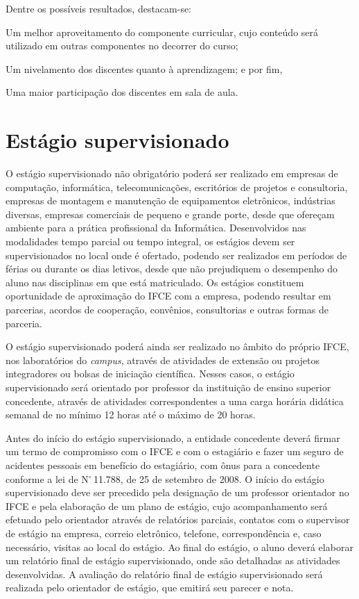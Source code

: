 \documentclass[
	12pt,				%
	openright,			%
	twoside,			%
	a4paper,			%
	chapter=TITLE,		%
	english,			%
	french,				%
	spanish,			%
	brazil,				%
	]{abntex2}
\begin{document}
Dentre os possíveis resultados, destacam-se: 
\begin{alineas}
\item Um melhor aproveitamento do componente curricular, cujo conteúdo será utilizado em outras componentes no decorrer do curso;
\item Um nivelamento dos discentes quanto à aprendizagem; e por fim,
\item Uma maior participação dos discentes em sala de aula.
\end{alineas}



\chapter{Estágio supervisionado}

O estágio supervisionado não obrigatório poderá ser realizado em empresas de computação, informática, telecomunicações, escritórios de projetos e consultoria, empresas de montagem e manutenção de equipamentos eletrônicos, indústrias diversas, empresas comerciais de pequeno e grande porte, desde que ofereçam ambiente para a prática profissional da Informática.  Desenvolvidos nas modalidades tempo parcial ou tempo integral, os estágios devem ser supervisionados no local onde é ofertado, podendo ser realizados em períodos de férias ou durante os dias letivos, desde que não prejudiquem o desempenho do aluno nas disciplinas em que está matriculado.
Os estágios constituem oportunidade de aproximação do IFCE com a empresa, podendo resultar em parcerias, acordos de cooperação, convênios, consultorias e outras formas de parceria.


O estágio supervisionado poderá ainda ser realizado no âmbito do próprio IFCE, nos laboratórios do \textit{campus}, através de atividades de extensão ou projetos integradores ou bolsas de iniciação científica. Nesses casos, o estágio supervisionado será orientado por professor da instituição de ensino superior concedente, através de atividades correspondentes a uma carga horária didática semanal de no mínimo 12 horas até o máximo de 20 horas.

Antes do início do estágio supervisionado, a entidade concedente deverá firmar um termo de compromisso com o IFCE e com o estagiário e fazer um seguro de acidentes pessoais em benefício do estagiário, com ônus para a concedente conforme a lei de N$^\circ$\,11.788, de 25 de setembro de 2008. O início do estágio supervisionado deve ser precedido pela designação de um professor orientador no IFCE e pela elaboração de um plano de estágio, cujo acompanhamento será efetuado pelo orientador através de relatórios parciais, contatos com o supervisor de estágio na empresa, correio eletrônico, telefone, correspondência e, caso necessário, visitas ao local do estágio. Ao final do estágio, o aluno deverá elaborar um relatório final de estágio supervisionado, onde são detalhadas as atividades desenvolvidas. A avaliação do relatório final de estágio supervisionado será realizada pelo orientador de estágio, que emitirá seu parecer e nota. 
\end{document}
